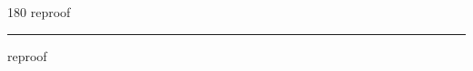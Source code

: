 
\begin{frame}
\begin{center}
\begin{turn}{180}
{\fontsize{2.5cm}{1em}\selectfont reproof}
\end{turn}
\vspace{1em}\par  
\hrule
\vspace{1em}\par  
{\fontsize{2.5cm}{1em}\selectfont reproof}
\end{center}
\end{frame}
